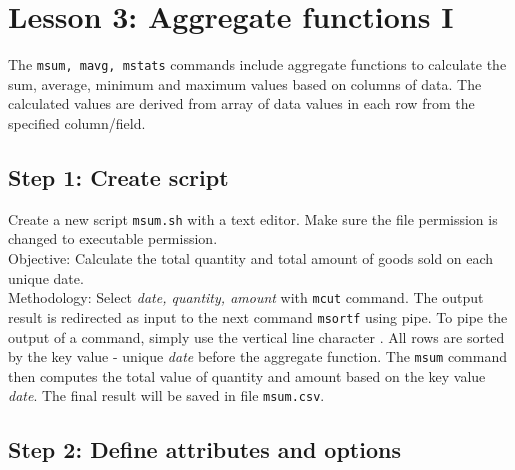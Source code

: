 

%


\section{Lesson 3: Aggregate functions I }

The \verb|msum, mavg, mstats| commands include aggregate functions to calculate the sum, average, minimum and maximum values based on columns of data. The calculated values are derived from array of data values in each row from the specified column/field.


\subsection{Step 1: Create script}

Create a new script \verb|msum.sh| with a text editor. Make sure the file permission is changed to executable permission. \\

Objective: Calculate the total quantity and total amount of goods sold on each unique date. \\

Methodology: Select \emph{date, quantity, amount} with \verb|mcut| command. The output result is redirected as input to the next command \verb|msortf| using pipe. To pipe the output of a command, simply use the vertical line character  \textbar. All rows are sorted by the key value - unique \emph{date} before the aggregate function. The \verb|msum| command then computes the total value of quantity and amount based on the key value \emph{date}. The final result will be saved in file \verb|msum.csv|.

 \subsection{Step 2: Define attributes and options }


